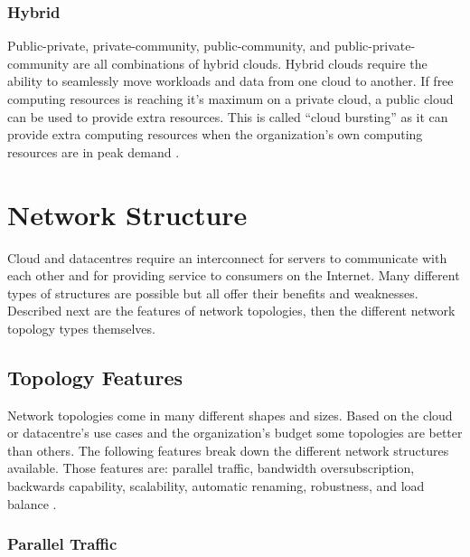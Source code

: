 \documentclass[12pt]{article}
\begin{document}
\subsubsection{Hybrid} \label{ssub:deploy-hybrid}

Public-private, private-community, public-community, and public-private-community are all combinations of hybrid clouds. Hybrid clouds require the ability to seamlessly move workloads and data from one cloud to another. If free computing resources is reaching it's maximum on a private cloud, a public cloud can be used to provide extra resources. This is called ``cloud bursting'' as it can provide extra computing resources when the organization's own computing resources are in peak demand \cite{dillon2010cloud}.




\section{Network Structure} \label{sec:network-structure}

Cloud and datacentres require an interconnect for servers to communicate with each other and for providing service to consumers on the Internet. Many different types of structures are possible but all offer their benefits and weaknesses. Described next are the features of network topologies, then the different network topology types themselves.


\subsection{Topology Features} \label{sub:topology-features}

Network topologies come in many different shapes and sizes. Based on the cloud or datacentre's use cases and the organization's budget some topologies are better than others. The following features break down the different network structures available. Those features are: parallel traffic, bandwidth oversubscription, backwards capability, scalability, automatic renaming, robustness, and load balance \cite{wang2015survey}.


\subsubsection{Parallel Traffic} \label{ssub:parallel-traffic}
\end{document}
